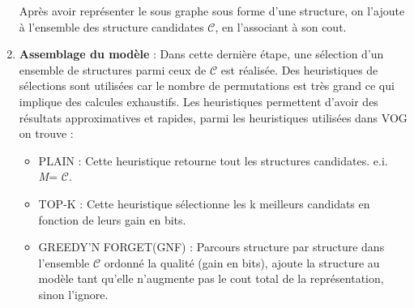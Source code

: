 \begin{enumerate}
\begin{enumerate}[label=\alph*]
  \end{enumerate} 
  
  
Après avoir représenter le sous graphe sous forme d'une structure, on l'ajoute à l'ensemble des structure candidates $\mathcal{C}$, en l'associant à son cout.

\item \textbf{Assemblage du modèle }: Dans cette dernière étape, une sélection d'un ensemble de structures parmi ceux de $\mathcal{C}$ est réalisée. Des heuristiques de sélections sont utilisées car le nombre de permutations est très grand ce qui implique des calcules exhaustifs. Les heuristiques permettent d'avoir des résultats approximatives et rapides, parmi les heuristiques utilisées dans VOG on trouve :
\begin{itemize}
\item PLAIN : Cette heuristique retourne tout les structures candidates. e.i. \textit{M}= $\mathcal{C}$.
\item TOP-K :  Cette heuristique sélectionne les k meilleurs candidats en fonction de leurs gain en bits.
\item GREEDY'N FORGET(GNF) : Parcours structure par structure dans l'ensemble $\mathcal{C}$ ordonné la qualité (gain en bits), ajoute la structure au modèle tant qu'elle n'augmente pas le cout total de la représentation, sinon l'ignore.%
\end{itemize}  
\end{enumerate}







